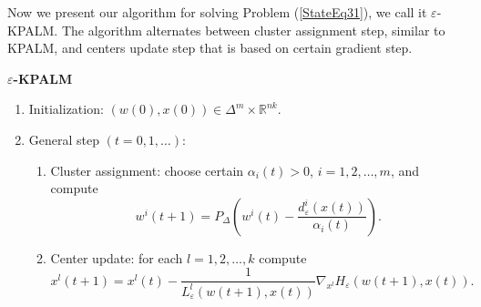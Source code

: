 \documentclass[12pt]{article}
\numberwithin{equation}{section}
\begin{document}
Now we present our algorithm for solving Problem (\ref{StateEq31}), we call it $\varepsilon$-KPALM.  The algorithm alternates between cluster assignment step, similar to  KPALM, and centers update step that is based on certain gradient step.

\begin{framed}
\noindent \textbf{$\varepsilon$-KPALM}
\begin{enumerate}[(1)]
	\item Initialization: $(w(0),x(0)) \in \Delta^m \times \mathbb{R}^{nk} .$
	\item General step $\left( t=0,1, \ldots \right)$:
	\begin{enumerate}[(2.1)]
		\item Cluster assignment: choose certain $\alpha_i(t) > 0$, $i=1,2, \ldots, m$, and compute
		\begin{equation}
			w^i(t+1) = P_{\Delta} \left(w^i(t) - \frac{d_{\varepsilon}^i(x(t))}{\alpha_i(t)}\right) . \label{StateEq32}
		\end{equation}
		\item Center update: for each $l=1, 2, \ldots ,k$ compute
		\begin{equation}
			x^l(t+1) = x^l(t) - \frac{1}{L^l_{\varepsilon}(w(t+1), x(t))}\nabla_{x^l} H_{\varepsilon}(w(t+1), x(t)) . \label{StateEq33}
		\end{equation}
	\end{enumerate}
\end{enumerate}
\end{framed}
\end{document}
